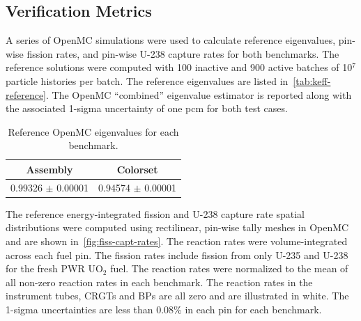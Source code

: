 \subsection{Verification Metrics}
\label{subsec:metrics}

A series of OpenMC simulations were used to calculate reference eigenvalues, pin-wise fission rates, and pin-wise U-238 capture rates for both benchmarks. The reference solutions were computed with 100 inactive and 900 active batches of 10$^7$ particle histories per batch. The reference eigenvalues are listed in~\autoref{tab:keff-reference}. The OpenMC ``combined'' eigenvalue estimator is reported along with the associated 1-sigma uncertainty of one pcm for both test cases.

\begin{table}[h!]
  \centering
  \caption{Reference OpenMC eigenvalues for each benchmark.}
  \label{tab:keff-reference} 
  \begin{tabular}{c c}
  \toprule
  {\bf Assembly} &
  {\bf Colorset} \\
  \midrule
  0.99326 $\pm$ 0.00001 & 0.94574 $\pm$ 0.00001 \\
  \bottomrule
\end{tabular}
\end{table}

The reference energy-integrated fission and U-238 capture rate spatial distributions were computed using rectilinear, pin-wise tally meshes in OpenMC and are shown in~\autoref{fig:fiss-capt-rates}. The reaction rates were volume-integrated across each fuel pin. The fission rates include fission from only U-235 and U-238 for the fresh PWR UO$_2$ fuel. The reaction rates were normalized to the mean of all non-zero reaction rates in each benchmark. The reaction rates in the instrument tubes, CRGTs and BPs are all zero and are illustrated in white. The 1-sigma uncertainties are less than 0.08\% in each pin for each benchmark.

